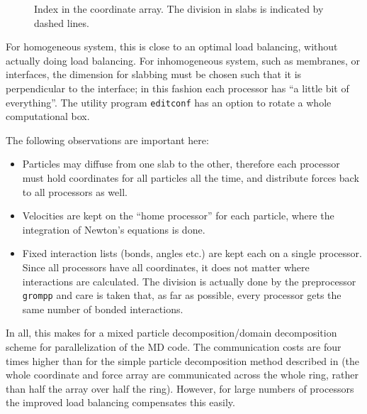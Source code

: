 \begin{figure}
\centerline{}
\caption[Index in the coordinate array.]{Index in the coordinate
array. The division in slabs is indicated by dashed lines.}
\label{fig:parsort}
\end{figure}

For homogeneous system, this is close to an optimal load balancing,
without actually doing load balancing. For inhomogeneous system, such
as membranes, or interfaces, the dimension for slabbing must be chosen
such that it is perpendicular to the interface; in this fashion each
processor has ``a little bit of everything''.  The {\gromacs} utility
program {\tt editconf} has an option to rotate a whole
computational box.

The following observations are important here:
\begin{itemize}
\item	Particles may diffuse from one slab to the other, therefore each processor
	must hold coordinates for all particles all the time, and distribute forces
	back to all processors as well.
\item	Velocities are kept on the ``home processor'' for each particle,
	where the integration of Newton's equations is done.
\item	Fixed interaction lists (bonds, angles etc.) are kept each
	on a single processor.  Since all processors have all
	coordinates, it does not matter where interactions are
	calculated.  The division is actually done by the {\gromacs}
	preprocessor {\tt grompp} and care is taken that, as far as
	possible, every processor gets the same number of bonded
	interactions.
\end{itemize}

In all, this makes for a mixed particle decomposition/domain decomposition scheme
for parallelization of the MD code. The communication costs are four times higher
than for the simple particle decomposition method described in 
(the whole coordinate and force array are communicated across the whole ring,
rather than half the array over half the ring).
However, for large numbers of processors the improved load balancing 
compensates this easily.

